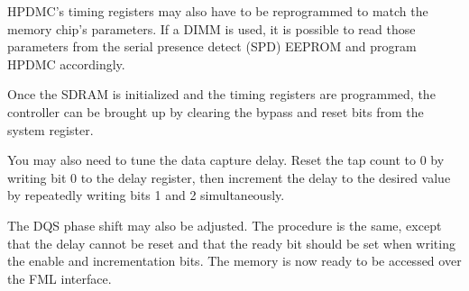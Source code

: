 \documentclass[a4paper,11pt]{article}
\begin{document}
HPDMC's timing registers may also have to be reprogrammed to match the memory chip's parameters. If a DIMM is used, it is possible to read those parameters from the serial presence detect (SPD) EEPROM and program HPDMC accordingly.

Once the SDRAM is initialized and the timing registers are programmed, the controller can be brought up by clearing the bypass and reset bits from the system register.

You may also need to tune the data capture delay. Reset the tap count to 0 by writing bit 0 to the delay register, then increment the delay to the desired value by repeatedly writing bits 1 and 2 simultaneously.

The DQS phase shift may also be adjusted. The procedure is the same, except that the delay cannot be reset and that the ready bit should be set when writing the enable and incrementation bits. The memory is now ready to be accessed over the FML interface.
\end{document}
